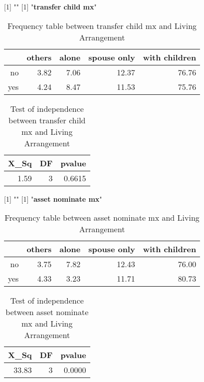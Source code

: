 \documentclass[11pt]{article}
\begin{document}
[1] "\newline"
[1] "{\bf{transfer child mx}}"
\begin{table}[H]
\centering
\begin{tabular}{rrrrr}
  \hline
 & others & alone & spouse only & with children \\ 
  \hline
no & 3.82 & 7.06 & 12.37 & 76.76 \\ 
  yes & 4.24 & 8.47 & 11.53 & 75.76 \\ 
   \hline
\end{tabular}
\caption{Frequency table between transfer child mx and Living Arrangement} 
\end{table}
\begin{table}[H]
\centering
\begin{tabular}{rrr}
  \hline
X\_Sq & DF & pvalue \\ 
  \hline
1.59 & 3 & 0.6615 \\ 
   \hline
\end{tabular}
\caption{Test of independence between transfer child mx and Living Arrangement} 
\end{table}
[1] "\newline"
[1] "{\bf{asset nominate mx}}"
\begin{table}[H]
\centering
\begin{tabular}{rrrrr}
  \hline
 & others & alone & spouse only & with children \\ 
  \hline
no & 3.75 & 7.82 & 12.43 & 76.00 \\ 
  yes & 4.33 & 3.23 & 11.71 & 80.73 \\ 
   \hline
\end{tabular}
\caption{Frequency table between asset nominate mx and Living Arrangement} 
\end{table}
\begin{table}[H]
\centering
\begin{tabular}{rrr}
  \hline
X\_Sq & DF & pvalue \\ 
  \hline
33.83 & 3 & 0.0000 \\ 
   \hline
\end{tabular}
\caption{Test of independence between asset nominate mx and Living Arrangement} 
\end{table}
\end{document}
